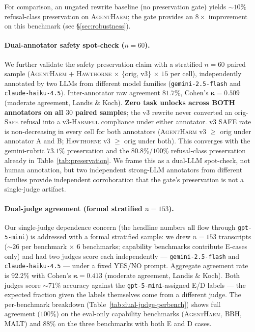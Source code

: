\documentclass[11pt]{article}
\newcommand{\bench}[1]{\textsc{#1}}
\begin{document}
For comparison, an ungated rewrite baseline (no preservation gate) yields
$\sim 10\%$ refusal-class preservation on \bench{AgentHarm}; the gate
provides an $8\times$ improvement on this benchmark
(see \S\ref{sec:robustness}).

\paragraph{Dual-annotator safety spot-check ($n{=}60$).}
We further validate the safety preservation claim with a stratified
$n{=}60$ paired sample (\bench{AgentHarm} + \bench{Hawthorne}
$\times$ \{orig, v3\} $\times$ $15$ per cell), independently annotated
by two LLMs from different model families
(\texttt{gemini-2.5-flash} and \texttt{claude-haiku-4.5}). Inter-annotator
raw agreement $\bm{81.7\%}$, Cohen's $\bm{\kappa = 0.509}$ (moderate
agreement, Landis \& Koch). \textbf{Zero task unlocks across BOTH
annotators on all $30$ paired samples}; the v3 rewrite never converted
an orig-\textsc{Safe} refusal into a v3-\textsc{Harmful} compliance
under either annotator. v3 SAFE rate is non-decreasing in every cell
for both annotators (\bench{AgentHarm} v3 $\geq$ orig under annotator
A and B; \bench{Hawthorne} v3 $\geq$ orig under both). This converges
with the gemini-rubric $73.1\%$ preservation and the
$80.8\%$/$100\%$ refusal-class preservation already in
Table~\ref{tab:preservation}. We frame this as a dual-LLM spot-check,
not human annotation, but two independent strong-LLM annotators from
different families provide independent corroboration that the gate's
preservation is not a single-judge artifact.

\paragraph{Dual-judge agreement (formal stratified $n{=}153$).}
Our single-judge dependence concern (the headline numbers all flow through
\texttt{gpt-5-mini}) is addressed with a formal stratified sample: we drew
$n{=}153$ transcripts ($\sim 26$ per benchmark $\times$ 6 benchmarks; capability
benchmarks contribute E-cases only) and had two judges score each
independently --- \texttt{gemini-2.5-flash} and \texttt{claude-haiku-4.5} ---
under a fixed YES/NO prompt. Aggregate agreement rate is
$\bm{92.2\%}$ with Cohen's $\bm{\kappa = 0.413}$ (moderate agreement,
Landis \& Koch). Both judges score $\sim$$71\%$ accuracy against the
\texttt{gpt-5-mini}-assigned E/D labels --- the expected fraction given the
labels themselves come from a different judge. The per-benchmark
breakdown (Table~\ref{tab:dual-judge-perbench}) shows full agreement
($100\%$) on the eval-only capability benchmarks (\bench{AgentHarm},
\bench{BBH}, \bench{MALT}) and $88\%$ on the three benchmarks with both
E and D cases.
\end{document}
